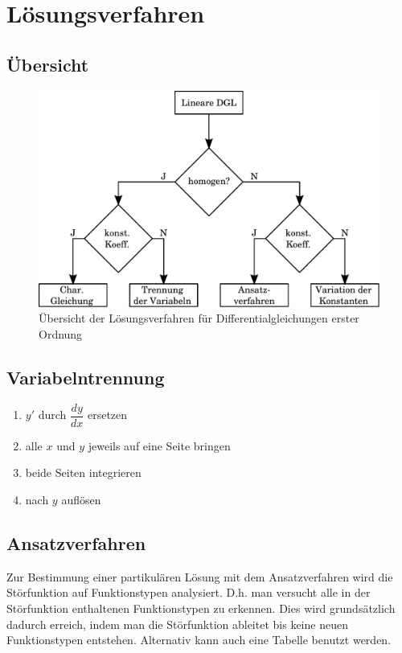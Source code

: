 \newpage
\section{Lösungsverfahren}

\subsection{Übersicht}
\begin{figure}[h!]
	\centering
	\includegraphics[width=1\textwidth]{diffgl_loes.pdf}
	\caption{Übersicht der Lösungsverfahren für Differentialgleichungen 
	erster Ordnung}
\end{figure}

\subsection{Variabelntrennung}
\begin{enumerate}
  \item $y'$ durch $\dfrac{dy}{dx}$ ersetzen
  \item alle $x$ und $y$ jeweils auf eine Seite bringen
  \item beide Seiten integrieren
  \item nach $y$ auflösen
\end{enumerate}

\subsection{Ansatzverfahren}
Zur Bestimmung einer partikulären Lösung mit dem Ansatzverfahren wird die 
Störfunktion auf Funktionstypen analysiert. D.h. man versucht alle in der
Störfunktion enthaltenen Funktionstypen zu erkennen. Dies wird grundsätzlich
dadurch erreich, indem man die Störfunktion ableitet bis keine neuen 
Funktionstypen entstehen. Alternativ kann auch eine Tabelle benutzt werden.

